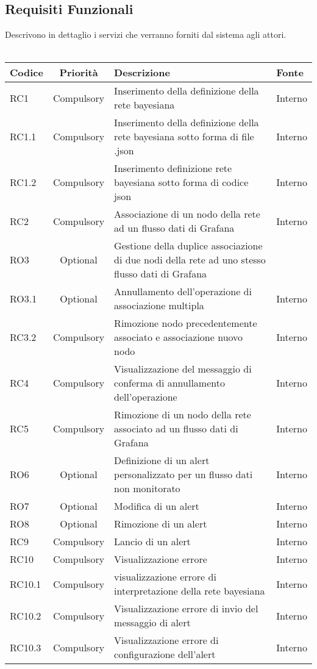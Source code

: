 		\subsection{Requisiti Funzionali}			
        Descrivono in dettaglio i servizi che verranno forniti dal sistema agli attori.
        \\
        \\
        \begin{tabular}{|l|c|l|l|}
		\hline
		Codice & Priorità & Descrizione & Fonte\\
        \hline
        RC1 & Compulsory & Inserimento della definizione della rete bayesiana & Interno\\
        \hline
        RC1.1 & Compulsory & Inserimento della definizione della rete bayesiana sotto forma di file .json & Interno\\
        \hline
        RC1.2 & Compulsory & Inserimento definizione rete bayesiana sotto forma di codice json & Interno\\
        \hline
        RC2 & Compulsory & Associazione di un nodo della rete ad un flusso dati di Grafana & Interno\\
        \hline
        RO3 & Optional & Gestione della duplice associazione di due nodi della rete ad uno stesso flusso dati di Grafana\\
        \hline
        RO3.1 & Optional & Annullamento dell'operazione di associazione multipla & Interno\\
        \hline
        RC3.2 & Compulsory & Rimozione nodo precedentemente associato e associazione nuovo nodo & Interno\\
        \hline
        RC4 & Compulsory & Visualizzazione del messaggio di conferma di annullamento dell'operazione & Interno\\
        \hline
        RC5 & Compulsory & Rimozione di un nodo della rete associato ad un flusso dati di Grafana & Interno\\
        \hline
        RO6 & Optional & Definizione di un alert personalizzato per un flusso dati non monitorato & Interno\\
        \hline
        RO7 & Optional & Modifica di un alert & Interno\\
        \hline
        RO8 & Optional & Rimozione di un alert & Interno\\
        \hline
        RC9 & Compulsory & Lancio di un alert & Interno\\
        \hline
        RC10 & Compulsory & Visualizzazione errore & Interno\\
        \hline
        RC10.1 & Compulsory & visualizzazione errore di interpretazione della rete bayesiana & Interno\\
        \hline
        RC10.2 & Compulsory & Visualizzazione errore di invio del messaggio di alert & Interno\\
        \hline
        RC10.3 & Compulsory & Visualizzazione errore di configurazione dell’alert & Interno\\
        \hline
        \end{tabular}

